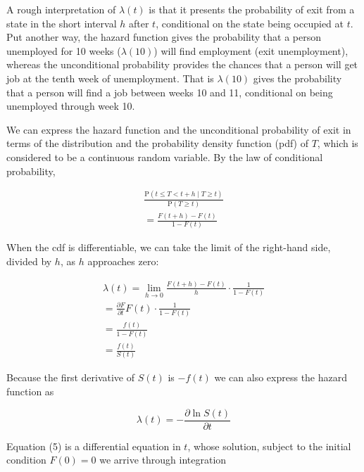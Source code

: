 \documentclass[
  11pt,
]{article}
\begin{document}
A rough interpretation of \(\lambda(t)\) is that it presents the
probability of exit from a state in the short interval \(h\) after
\(t\), conditional on the state being occupied at \(t\). Put another
way, the hazard function gives the probability that a person unemployed
for 10 weeks (\(\lambda(10)\)) will find employment (exit unemployment),
whereas the unconditional probability provides the chances that a person
will get job at the tenth week of unemployment. That is \(\lambda(10)\)
gives the probability that a person will find a job between weeks 10 and
11, conditional on being unemployed through week 10.

We can express the hazard function and the unconditional probability of
exit in terms of the distribution and the probability density function
(pdf) of \(T\), which is considered to be a continuous random variable.
By the law of conditional probability,

\begin{equation}
\begin{gathered}
\frac{\mathrm{P}(t \leq T < t + h \; | \; T \geq t)}{\mathrm{P}(T \geq t)} \\[8pt]
= \frac{F(t + h) - F(t)}{1 - F(t)}
\end{gathered}
\end{equation}

When the cdf is differentiable, we can take the limit of the right-hand
side, divided by \(h\), as \(h\) approaches zero:

\begin{equation}
\begin{gathered}
\lambda(t) = \lim_{h \to 0} \frac{F(t + h) - F(t)}{h}\cdot \frac{1}{1 - F(t)} \\[8pt]
= \frac{\partial F}{\partial t}F(t) \cdot \frac{1}{1 - F(t)} \\[8pt]
= \frac{f(t)}{1 - F(t)} \\[8pt]
= \frac{f(t)}{S(t)}
\end{gathered}
\end{equation}

Because the first derivative of \(S(t)\) is \(-f(t)\) we can also
express the hazard function as

\begin{equation}
\lambda(t) = - \frac{\partial \ln S(t)}{\partial t}
\end{equation}

Equation (5) is a differential equation in \(t\), whose solution,
subject to the initial condition \(F(0) = 0\) we arrive through
integration
\end{document}
